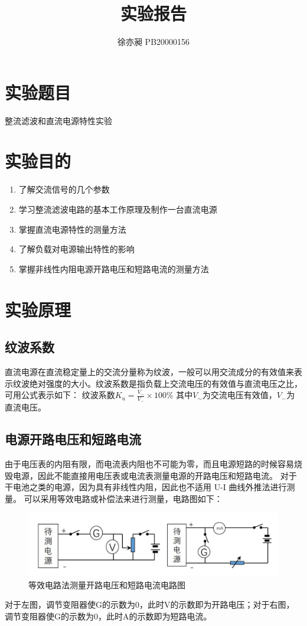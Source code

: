 \documentclass[UTF8]{ctexart}
\begin{document}
\title{实验报告}  
\author{徐亦昶 PB20000156}
\maketitle
\section{实验题目}整流滤波和直流电源特性实验
\section{实验目的}
\begin{enumerate}
    \item 了解交流信号的几个参数
    \item 学习整流滤波电路的基本工作原理及制作一台直流电源
    \item 掌握直流电源特性的测量方法
    \item 了解负载对电源输出特性的影响
    \item 掌握非线性内阻电源开路电压和短路电流的测量方法
\end{enumerate}
\section{实验原理}
\subsection{纹波系数}
直流电源在直流稳定量上的交流分量称为纹波，一般可以用交流成分的有效值来表示纹波绝对强度的大小。纹波系数是指负载上交流电压的有效值与直流电压之比，
可用公式表示如下：
\newline
纹波系数$K_u=\frac{V_\sim}{V_-}\times 100\%$
\newline
其中$V_\sim$为交流电压有效值，$V_-$为直流电压。
\subsection{电源开路电压和短路电流}
由于电压表的内阻有限，而电流表内阻也不可能为零，而且电源短路的时候容易烧毁电源，因此不能直接用电压表或电流表测量电源的开路电压和短路电流。
对于干电池之类的电源，因为具有非线性内阻，因此也不适用 U-I 曲线外推法进行测量。
可以采用等效电路或补偿法来进行测量，电路图如下：
\begin{figure}[h]
    \centering
    \includegraphics[scale=0.7]{电路图.PNG}
    \caption{等效电路法测量开路电压和短路电流电路图}
\end{figure}
对于左图，调节变阻器使G的示数为0，此时V的示数即为开路电压；对于右图，调节变阻器使G的示数为0，此时A的示数即为短路电流。
\end{document}
